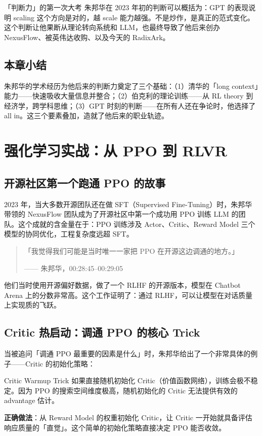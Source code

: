 \documentclass[a4paper]{article}
\begin{document}
\begin{importantbox}{「判断力」的第一次大考}
朱邦华在 2023 年初的判断可以概括为：GPT 的表现说明 scaling 这个方向是对的，越 scale 能力越强。不是炒作，是真正的范式变化。这个判断让他果断从理论转向系统和 LLM，也最终导致了他后来创办 NexusFlow、被英伟达收购、以及今天的 RadixArk。
\end{importantbox}

\subsection{本章小结}
朱邦华的学术经历为他后来的判断力奠定了三个基础：（1）清华的「long context」能力——快速吸收大量信息并整合；（2）伯克利的理论训练——从 RL theory 到经济学，跨学科思维；（3）GPT 时刻的判断——在所有人还在争论时，他选择了 all in。这三个要素叠加，造就了他后来的职业轨迹。


\section{强化学习实战：从 PPO 到 RLVR}

\subsection{开源社区第一个跑通 PPO 的故事}

2023 年，当大多数开源团队还在做 SFT（Supervised Fine-Tuning）时，朱邦华带领的 NexusFlow 团队成为了开源社区中第一个成功用 PPO 训练 LLM 的团队。这个成就的含金量在于：PPO 训练涉及 Actor、Critic、Reward Model 三个模型的协同优化，工程复杂度远超 SFT。

\begin{quote}
「我觉得我们可能是当时唯一一家把 PPO 在开源这边调通的地方。」\par
\hfill —— 朱邦华，00:28:45--00:29:05
\end{quote}

他们当时使用开源偏好数据，做了一个 RLHF 的开源版本，模型在 Chatbot Arena 上的分数非常高。这个工作证明了：通过 RLHF，可以让模型在对话质量上实现质的飞跃。

\subsection{Critic 热启动：调通 PPO 的核心 Trick}

当被追问「调通 PPO 最重要的因素是什么」时，朱邦华给出了一个非常具体的例子——Critic 的初始化策略：

\begin{importantbox}{Critic Warmup Trick}
如果直接随机初始化 Critic（价值函数网络），训练会极不稳定。因为 PPO 的搜索空间维度极高，随机初始化的 Critic 无法提供有效的 advantage 估计。\par
\textbf{正确做法}：从 Reward Model 的权重初始化 Critic，让 Critic 一开始就具备评估响应质量的「直觉」。这个简单的初始化策略直接决定 PPO 能否收敛。
\end{importantbox}
\end{document}
